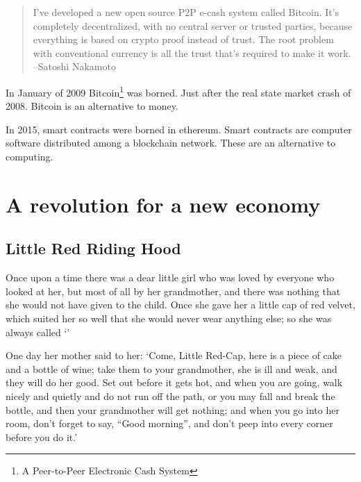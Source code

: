 \documentclass[oneside,11pt]{memoir} %
\begin{document}
\begin{quote}
I've developed a new open source P2P e-cash system called Bitcoin. It's completely decentralized, with no central server or trusted parties, because everything is based on crypto proof instead of trust. The root problem with conventional currency is all the trust that's required to make it work.\\
--Satoshi Nakamoto
\end{quote}

In January of 2009 Bitcoin\footnote{A Peer-to-Peer Electronic Cash System} was borned. Just after the real state market crash of 2008. Bitcoin is an alternative to money.

In 2015, smart contracts were borned in ethereum. Smart contracts are computer software distributed among a blockchain network. These are an alternative to computing.



\part{A revolution for a new economy}


\chapter{Little Red Riding Hood}

Once upon a time there was a dear little girl who was loved by everyone who looked at her, but most of all by her grandmother, and there was nothing that she would not have given to the child. Once she gave her a little cap of red velvet, which suited her so well that she would never wear anything else; so she was always called `'

One day her mother said to her: `Come, Little Red-Cap, here is a piece of cake and a bottle of wine; take them to your grandmother, she is ill and weak, and they will do her good. Set out before it gets hot, and when you are going, walk nicely and quietly and do not run off the path, or you may fall and break the bottle, and then your grandmother will get nothing; and when you go into her room, don't forget to say, ``Good morning'', and don't peep into every corner before you do it.'
\end{document}
